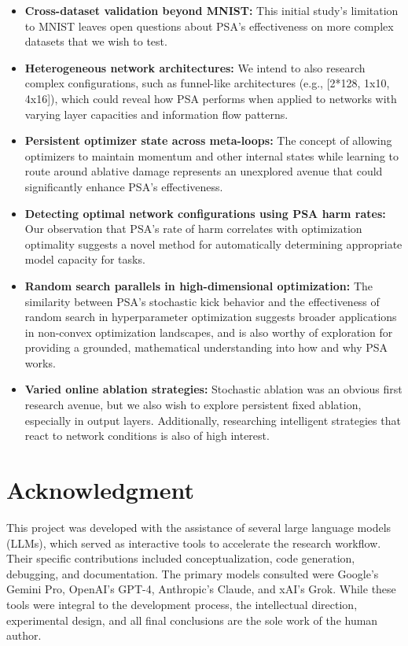 \documentclass[conference]{IEEEtran}
\begin{document}
\begin{itemize}
\item \textbf{Cross-dataset validation beyond MNIST:} This initial study's limitation to MNIST leaves open questions about PSA's effectiveness on more complex datasets that we wish to test.

\item \textbf{Heterogeneous network architectures:} We intend to also research complex configurations, such as funnel-like architectures (e.g., [2*128, 1x10, 4x16]), which could reveal how PSA performs when applied to networks with varying layer capacities and information flow patterns.

\item \textbf{Persistent optimizer state across meta-loops:} The concept of allowing optimizers to maintain momentum and other internal states while learning to route around ablative damage represents an unexplored avenue that could significantly enhance PSA's effectiveness.

\item \textbf{Detecting optimal network configurations using PSA harm rates:} Our observation that PSA's rate of harm correlates with optimization optimality suggests a novel method for automatically determining appropriate model capacity for tasks.

\item \textbf{Random search parallels in high-dimensional optimization:} The similarity between PSA's stochastic kick behavior and the effectiveness of random search in hyperparameter optimization suggests broader applications in non-convex optimization landscapes, and is also worthy of exploration for providing a grounded, mathematical understanding into how and why PSA works.

\item \textbf{Varied online ablation strategies:} Stochastic ablation was an obvious first research avenue, but we also wish to explore persistent fixed ablation, especially in output layers. Additionally, researching intelligent strategies that react to network conditions is also of high interest.

\end{itemize}

\section*{Acknowledgment}
This project was developed with the assistance of several large language models (LLMs), which served as interactive tools to accelerate the research workflow. Their specific contributions included conceptualization, code generation, debugging, and documentation. The primary models consulted were Google's Gemini Pro, OpenAI's GPT-4, Anthropic's Claude, and xAI's Grok. While these tools were integral to the development process, the intellectual direction, experimental design, and all final conclusions are the sole work of the human author.
\end{document}
